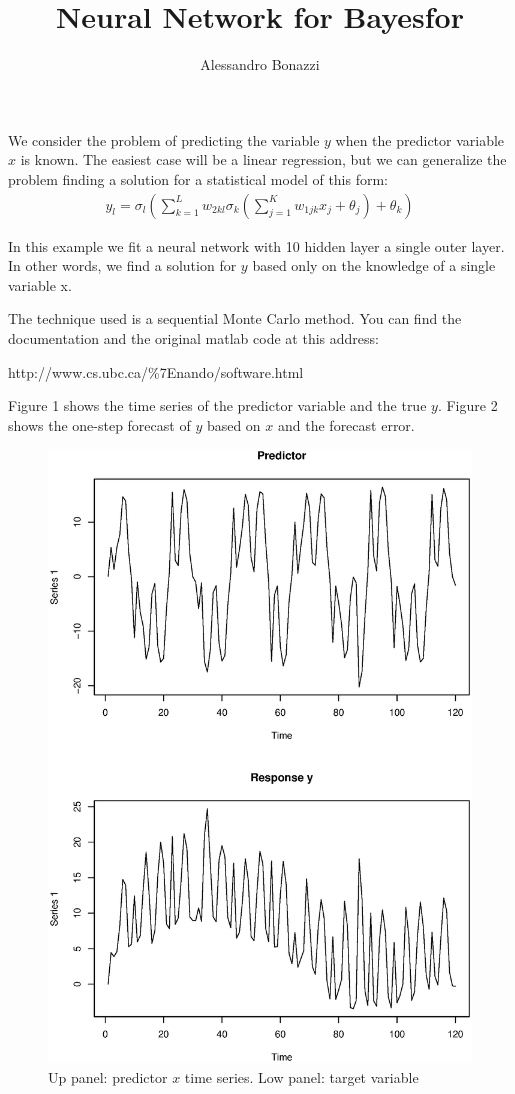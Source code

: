 \documentclass[11pt,a4paper]{article}
\author{Alessandro Bonazzi}
\title{Neural Network for Bayesfor}
\begin{document}
\maketitle

We consider the problem of predicting the variable $y$ when the predictor
variable $x$ is known.
The easiest case will be a linear regression, but we can generalize the problem finding a solution for a statistical model of this form:
\begin{eqnarray}
     y_l = \sigma_l ( \sum_{k=1}^L w_{2kl}  \sigma_k ( \sum^K_{j=1} w_{1jk} x_j + \theta_j ) + \theta_k ) 
\end{eqnarray}

In this example we fit a neural network with 10 hidden layer a single outer layer. In other words, we find a solution for $y$ based only on the knowledge of a single variable x.

The technique used is a sequential Monte Carlo method.
You can find the documentation and the original matlab code at this address:


http://www.cs.ubc.ca/\%7Enando/software.html


Figure 1 shows the time series of the predictor variable and the true $y$.
Figure 2 shows the one-step forecast of $y$ based on $x$ and the forecast error.

\begin{figure} \includegraphics[width=12cm]{problem.eps}
\caption{Up panel: predictor $x$ time series. Low panel: target variable}
\end{figure}
\end{document}
